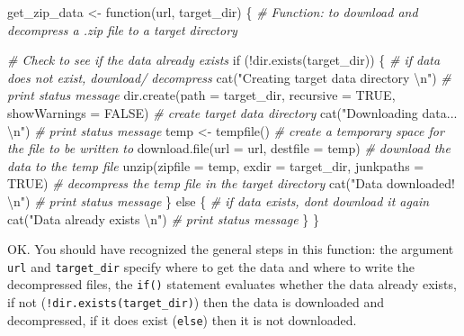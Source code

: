 \documentclass[
  letterpaper,
]{latex/krantz}
\newenvironment{Shaded}{\begin{snugshade}}{\end{snugshade}}
\newcommand{\AttributeTok}[1]{\textcolor[rgb]{0.00,0.00,0.00}{#1}}
\newcommand{\CommentTok}[1]{\textcolor[rgb]{0.00,0.00,0.00}{\textit{#1}}}
\newcommand{\ConstantTok}[1]{\textcolor[rgb]{0.00,0.00,0.00}{#1}}
\newcommand{\ControlFlowTok}[1]{\textcolor[rgb]{0.00,0.00,0.00}{#1}}
\newcommand{\FunctionTok}[1]{\textcolor[rgb]{0.00,0.00,0.00}{#1}}
\newcommand{\NormalTok}[1]{\textcolor[rgb]{0.00,0.00,0.00}{#1}}
\newcommand{\OtherTok}[1]{\textcolor[rgb]{0.00,0.00,0.00}{#1}}
\newcommand{\SpecialCharTok}[1]{\textcolor[rgb]{0.00,0.00,0.00}{#1}}
\newcommand{\StringTok}[1]{\textcolor[rgb]{0.00,0.00,0.00}{#1}}
\begin{document}
\begin{Shaded}
\begin{Highlighting}[]
\NormalTok{get\_zip\_data }\OtherTok{\textless{}{-}} \ControlFlowTok{function}\NormalTok{(url, target\_dir) \{}
  \CommentTok{\# Function: to download and decompress a .zip file to a target directory}

  \CommentTok{\# Check to see if the data already exists}
  \ControlFlowTok{if}\NormalTok{ (}\SpecialCharTok{!}\FunctionTok{dir.exists}\NormalTok{(target\_dir)) \{ }\CommentTok{\# if data does not exist, download/ decompress}
    \FunctionTok{cat}\NormalTok{(}\StringTok{"Creating target data directory }\SpecialCharTok{\textbackslash{}n}\StringTok{"}\NormalTok{) }\CommentTok{\# print status message}
    \FunctionTok{dir.create}\NormalTok{(}\AttributeTok{path =}\NormalTok{ target\_dir, }\AttributeTok{recursive =} \ConstantTok{TRUE}\NormalTok{, }\AttributeTok{showWarnings =} \ConstantTok{FALSE}\NormalTok{) }\CommentTok{\# create target data directory}
    \FunctionTok{cat}\NormalTok{(}\StringTok{"Downloading data... }\SpecialCharTok{\textbackslash{}n}\StringTok{"}\NormalTok{) }\CommentTok{\# print status message}
\NormalTok{    temp }\OtherTok{\textless{}{-}} \FunctionTok{tempfile}\NormalTok{() }\CommentTok{\# create a temporary space for the file to be written to}
    \FunctionTok{download.file}\NormalTok{(}\AttributeTok{url =}\NormalTok{ url, }\AttributeTok{destfile =}\NormalTok{ temp) }\CommentTok{\# download the data to the temp file}
    \FunctionTok{unzip}\NormalTok{(}\AttributeTok{zipfile =}\NormalTok{ temp, }\AttributeTok{exdir =}\NormalTok{ target\_dir, }\AttributeTok{junkpaths =} \ConstantTok{TRUE}\NormalTok{) }\CommentTok{\# decompress the temp file in the target directory}
    \FunctionTok{cat}\NormalTok{(}\StringTok{"Data downloaded! }\SpecialCharTok{\textbackslash{}n}\StringTok{"}\NormalTok{) }\CommentTok{\# print status message}
\NormalTok{  \} }\ControlFlowTok{else}\NormalTok{ \{ }\CommentTok{\# if data exists, don\textquotesingle{}t download it again}
    \FunctionTok{cat}\NormalTok{(}\StringTok{"Data already exists }\SpecialCharTok{\textbackslash{}n}\StringTok{"}\NormalTok{) }\CommentTok{\# print status message}
\NormalTok{  \}}
\NormalTok{\}}
\end{Highlighting}
\end{Shaded}

OK. You should have recognized the general steps in this function: the
argument \texttt{url} and \texttt{target\_dir} specify where to get the
data and where to write the decompressed files, the \texttt{if()}
statement evaluates whether the data already exists, if not
(\texttt{!dir.exists(target\_dir)}) then the data is downloaded and
decompressed, if it does exist (\texttt{else}) then it is not
downloaded.
\end{document}
